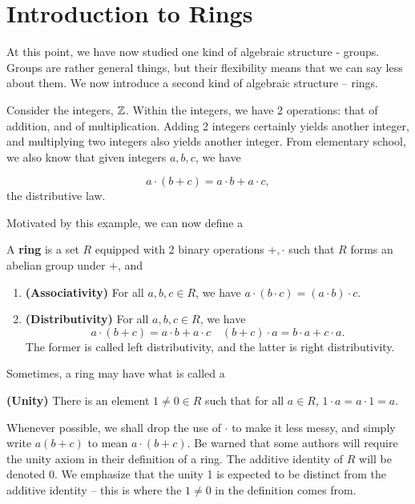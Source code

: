 \documentclass[./main.tex]{subfiles}
\begin{document}
\section{Introduction to Rings}
At this point, we have now studied one kind of algebraic structure - groups.
Groups are rather general things, but their flexibility means that we can say
less about them. We now introduce a second kind of algebraic structure -- rings.

Consider the integers, $\mathbb{Z}$. Within the integers, we have 2 operations: that of
addition, and of multiplication. Adding 2 integers certainly yields another
integer, and multiplying two integers also yields another integer. From
elementary school, we also know that given integers $a, b, c$, we have 

\[
    a \cdot (b + c) = a \cdot b + a \cdot c,
\]
the distributive law. 

Motivated by this example, we can now define a
\begin{definition}[Ring]
\label{definition:ring}
    A \textbf{ring} is a set $R$ equipped with 2 binary operations $+, \cdot$
    such that $R$ forms an abelian group under $+$, and 
    \begin{enumerate}
        \item \textbf{(Associativity)} For all $a, b, c \in R$, we have $a \cdot (b \cdot c) = (a \cdot b) \cdot c$.
        \item \textbf{(Distributivity)} For all $a, b, c \in R$, we have 
            \[
                a \cdot (b + c) = a \cdot b + a \cdot c \quad (b + c) \cdot a = b \cdot a + c \cdot a.
            \]
            The former is called left distributivity, and the latter is right distributivity.
    \end{enumerate}
\end{definition}
Sometimes, a ring may have what is called a 
\begin{center}
    \textbf{(Unity)} There is an element $1 \neq 0 \in R$ such that for all $a
        \in R$, $1 \cdot a = a \cdot 1 = a$.
\end{center}
Whenever possible, we shall drop the use of $\cdot$ to make it less messy, and
simply write $a(b+c)$ to mean $a \cdot (b+c)$. Be warned that some authors will
require the unity axiom in their definition of a ring. The additive identity of
$R$ will be denoted 0. We emphasize that the unity 1 is expected to be distinct
from the additive identity -- this is where the $1 \neq 0$ in the definition
comes from. 
\end{document}
